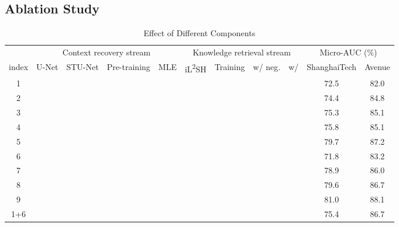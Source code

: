 \documentclass[lettersize,journal]{IEEEtran}
\begin{document}
\subsection{Ablation Study}
\begin{table*}[!t]
	\centering
	\caption{Effect of Different Components}
	\label{tab3}
	\begin{tabular}{@{}ccccccccccc@{}}
		\toprule
		& \multicolumn{4}{c}{Context   recovery stream}       & \multicolumn{4}{c}{Knowledge   retrieval stream}  & \multicolumn{2}{c}{Micro-AUC   (\%)} \\ \cmidrule(l){2-11} 
		index & U-Net      & STU-Net    & Pre-training & MLE  & iL\textsuperscript{2}SH  & Training   & w/ neg.    & w/  & ShanghaiTech  & Avenue  \\ \midrule
		1     & \checkmark &            & \checkmark   &            &            &            &            &            & 72.5                 & 82.0          \\
		2     &            & \checkmark &              &            &            &            &            &            & 74.4                 & 84.8          \\
		3     &            & \checkmark & \checkmark   &            &            &            &            &            & 75.3                 & 85.1          \\
		4     & \checkmark &            & \checkmark   & \checkmark &            &            &            &            & 75.8                 & 85.1          \\
		5     &            & \checkmark & \checkmark   & \checkmark &            &            &            &            & 79.7                 & 87.2          \\ \midrule
		6     &            &            &              &            & \checkmark &            &            &            & 71.8                 & 83.2          \\
		7     &            &            &              &            & \checkmark & \checkmark & \checkmark &            & 78.9                 & 86.0          \\
		8     &            &            &              &            & \checkmark & \checkmark &            &            & 79.6                 & 86.7          \\
		9     &            &            &              &            & \checkmark & \checkmark &            & \checkmark & 81.0                 & 88.1          \\ \midrule
		1+6   & \checkmark &            & \checkmark   &            & \checkmark &            &            &            & 75.4                 & 86.7          \\

\end{tabular}
\end{table*}
\end{document}
